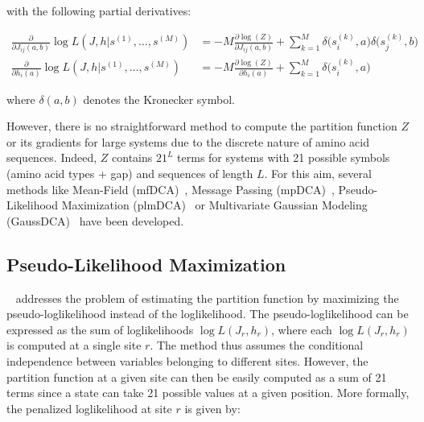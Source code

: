         with the following partial derivatives:

        \begin{equation}
            \begin{split}
                \frac{\partial}{\partial J_{ij}(a, b)} \log{L}(J, h \vert s^{(1)}, \dotsc, s^{(M)}) & = 
                    -M \frac{\partial \log(Z)}{\partial J_{ij}(a, b)} + \sum\limits_{k=1}^M \delta\Big(s_i^{(k)}, a\Big) \delta\Big(s_j^{(k)}, b\Big) \\
                 \frac{\partial}{\partial h_{i}(a)} \log{L}(J, h \vert s^{(1)}, \dotsc, s^{(M)}) & = 
                    -M \frac{\partial \log(Z)}{\partial h_{i}(a)} + \sum\limits_{k=1}^M \delta\Big(s_i^{(k)}, a\Big)
            \end{split}
        \end{equation}

        where $\delta(a, b)$ denotes the Kronecker symbol.

        However, there is no straightforward method to compute the partition function $Z$ or its gradients for large
        systems due to the discrete nature of amino acid sequences. Indeed, $Z$ contains $21^L$ terms for systems with 21 possible symbols (amino acid types + gap)
        and sequences of length $L$. For this aim, several methods like Mean-Field (mfDCA)~\cite{MorcosE1293}, Message Passing (mpDCA)~\cite{Weigt2009},
        Pseudo-Likelihood Maximization (plmDCA)~\cite{EKEBERG2014341} or Multivariate Gaussian Modeling (GaussDCA)~\cite{10.1371/journal.pone.0092721}
        have been developed.

    \subsection{Pseudo-Likelihood Maximization}

        ~\cite{EKEBERG2014341} addresses the problem of estimating the partition function by maximizing the pseudo-loglikelihood instead of the loglikelihood.
        The pseudo-loglikelihood can be expressed as the sum of loglikelihoods $\log{L}(J_r, h_r)$, where each $\log{L}(J_r, h_r)$ is computed
        at a single site $r$. The method thus assumes the conditional independence between variables belonging to different sites.
        However, the partition function at a given site can then be easily computed as a sum of 21 terms since a state can take 21 possible values at a given position.
        More formally, the penalized loglikelihood at site $r$ is given by:

